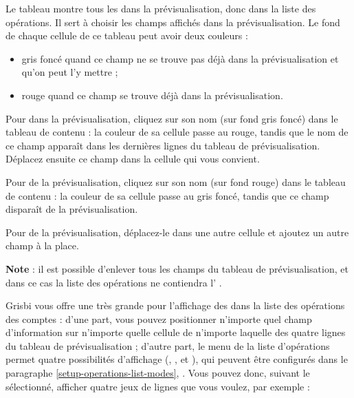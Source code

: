 Le tableau montre tous les  dans la prévisualisation, donc dans la liste des opérations. Il sert à choisir les champs affichés dans la prévisualisation. Le fond de chaque cellule de ce tableau peut avoir deux couleurs :

\begin{itemize}
	\item gris foncé{\couleur} quand ce champ ne se trouve pas déjà dans la prévisualisation et qu'on peut l'y mettre ;
	\item rouge{\couleur} quand ce champ se trouve déjà dans la prévisualisation.
\end{itemize}

Pour  dans la prévisualisation, cliquez sur son nom (sur fond gris foncé{\couleur}) dans le tableau de contenu : la couleur de sa cellule passe au rouge{\couleur}, tandis que le nom de ce champ apparaît dans les dernières lignes du tableau de prévisualisation. Déplacez ensuite ce champ dans la cellule qui vous convient.

Pour  de la  prévisualisation, cliquez sur son nom (sur fond rouge{\couleur}) dans le tableau de contenu : la couleur de sa cellule passe au gris foncé{\couleur}, tandis que ce champ disparaît de la prévisualisation.

\ifIllustration
\fi


Pour  de la  prévisualisation, déplacez-le dans une autre cellule et ajoutez un autre champ à la place.

\textbf{Note} : il est possible d'enlever tous les champs du tableau de prévisualisation, et dans ce cas la liste des opérations ne contiendra l' .

Grisbi vous offre une très grande  pour l'affichage des  dans la liste des opérations des comptes : d'une part, vous pouvez positionner n'importe quel champ d'information sur n'importe quelle cellule de n'importe laquelle des quatre lignes du tableau de prévisualisation ; d'autre part, le menu  de la liste d'opérations permet quatre possibilités d'affichage (, ,  et ), qui peuvent être configurés dans le paragraphe \vref{setup-operations-list-modes}, . Vous pouvez donc, suivant le  sélectionné, afficher quatre jeux de lignes que vous voulez, par exemple :

